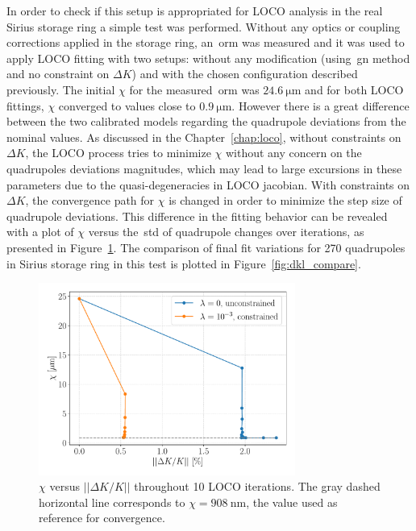 In order to check if this setup is appropriated for LOCO analysis in the real Sirius storage ring a simple test was performed. Without any optics or coupling corrections applied in the storage ring, an~\gls{orm} was measured and it was used to apply LOCO fitting with two setups: without any modification (using~\gls{gn} method and no constraint on $\Delta K$) and with the chosen configuration described previously. The initial $\chi$ for the measured~\gls{orm} was $\SI{24.6}{\micro\meter}$ and for both LOCO fittings, $\chi$ converged to values close to $\SI{0.9}{\micro\meter}$. However there is a great difference between the two calibrated models regarding the quadrupole deviations from the nominal values. As discussed in the Chapter~\ref{chap:loco}, without constraints on $\Delta K$, the LOCO process tries to minimize $\chi$ without any concern on the quadrupoles deviations magnitudes, which may lead to large excursions in these parameters due to the quasi-degeneracies in LOCO jacobian. With constraints on $\Delta K$, the convergence path for $\chi$ is changed in order to minimize the step size of quadrupole deviations. This difference in the fitting behavior can be revealed with a plot of $\chi$ versus the~\gls{std} of quadrupole changes over iterations, as presented in Figure~\ref{fig:chi_vs_dkl}. The comparison of final fit variations for 270 quadrupoles in Sirius storage ring in this test is plotted in Figure~\ref{fig:dkl_compare}. 
\begin{figure}[h!]
\centering
\includegraphics[width=0.75\textwidth]{figures/chi_versus_dk_cumsum.pdf}
\caption{$\chi$ versus $||\Delta K/K||$ throughout 10 LOCO iterations. The gray dashed horizontal line corresponds to $\chi = \SI{908}{\nano\meter}$, the value used as reference for convergence.}
\label{fig:chi_vs_dkl}
\end{figure}
